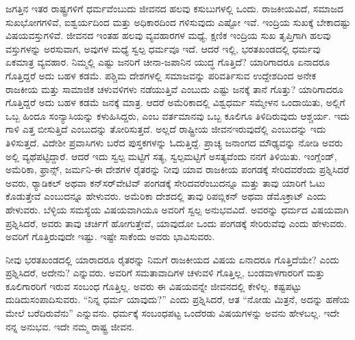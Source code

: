 ಜಗತ್ತಿನ ಇತರ ರಾಷ್ಟ್ರಗಳಿಗೆ ಧರ್ಮವೆಂಬುದು ಜೀವನದ ಹಲವು ಕಸುಬುಗಳಲ್ಲಿ ಒಂದು. ರಾಜಕೀಯವಿದೆ, ಸಮಾಜದ ಸುಖಭೋಗಗಳಿವೆ, ಐಶ್ವರ್ಯದಿಂದ ಮತ್ತು ಅಧಿಕಾರದಿಂದ ಗಳಿಸುವುದು ಎಷ್ಟೋ ಇವೆ. ಇಂದ್ರಿಯ ಸುಖಕ್ಕೆ ಬೇಕಾದಷ್ಟು ವಿಷಯವಸ್ತುಗಳಿವೆ. ಜೀವನದ ಇಂತಹ ಹಲವು ವ್ಯವಹಾರಗಳ ಮಧ್ಯೆ, ಕ್ಷಣಿಕ ಇಂದ್ರಿಯ ಸುಖ ತೃಪ್ತಿಗಾಗಿ ಹಲವು ವಸ್ತುಗಳನ್ನು ಅರಸುವಾಗ, ಅವುಗಳ ಮಧ್ಯೆ ಸ್ವಲ್ಪ ಧರ್ಮವೂ ಇದೆ. ಆದರೆ ಇಲ್ಲಿ, ಭರತಖಂಡದಲ್ಲಿ ಧರ್ಮವು ಏಕಮಾತ್ರ ವ್ಯವಹಾರ. ನಿಮ್ಮಲ್ಲಿ ಎಷ್ಟು ಜನರಿಗೆ ಚೀನಾ-ಜಪಾನಿನ ಯುದ್ಧ ಗೊತ್ತಿದೆ? ಯಾರಿಗಾದರೂ ಏನಾದರೂ ಗೊತ್ತಿದ್ದರೆ ಅದು ಬಹಳ ಕಡಮೆ. ಪಶ್ಚಿಮ ದೇಶಗಳಲ್ಲಿ ಸಮಾಜವನ್ನು ಪರಿವರ್ತಿಸುವ ಉದ್ದೇಶದಿಂದ ಅನೇಕ ರಾಜಕೀಯ ಮತ್ತು ಸಾಮಾಜಿಕ ಚಳುವಳಿಗಳು ನಡೆಯುತ್ತಿವೆ ಎಂಬುದು ಎಷ್ಟು ಜನಕ್ಕೆ ತಾನೆ ಗೊತ್ತು? ಯಾರಿಗಾದರೂ ಗೊತ್ತಿದ್ದರೆ ಅದು ಬಹಳ ಕಡಮೆ ಜನಕ್ಕೆ ಮಾತ್ರ. ಆದರೆ ಅಮೆರಿಕಾದಲ್ಲಿ ವಿಶ್ವಧರ್ಮ ಸಮ್ಮೇಳನ ಒಂದಾಯಿತು, ಅಲ್ಲಿಗೆ ಒಬ್ಬ ಹಿಂದೂ ಸಂನ್ಯಾಸಿಯನ್ನು ಕಳುಹಿಸಿದ್ದರು, ಎಂಬ ವರ್ತಮಾನವು ಒಬ್ಬ ಕೂಲಿಗೂ ತಿಳಿದಿರುವುದು ಆಶ್ಚರ್ಯ. ಇದು ಗಾಳಿ ಎತ್ತ ಬೀಸುತ್ತಿದೆ ಎಂಬುದನ್ನು ತೋರಿಸುತ್ತದೆ. ಅಲ್ಲದೆ ರಾಷ್ಟ್ರೀಯ ಜೀವನ\break ಇರುವುದೆಲ್ಲಿ ಎಂಬುದನ್ನು ಇದು ತಿಳಿಸುತ್ತದೆ. ವಿದೇಶೀ ಪ್ರವಾಸಿಗಳು ಬರೆದ ಪುಸ್ತಕಗಳನ್ನು ಓದುತ್ತಿದ್ದೆ. ಪ್ರಾಚ್ಯ ಜನಾಂಗದ ಮೌಢ್ಯವನ್ನು ನೋಡಿ ಅವರು ಅಲ್ಲಿ ವ್ಯಥೆಪಟ್ಟಿದ್ದಾರೆ. ಆದರೆ ಇದು ಸ್ವಲ್ಪ ಮಟ್ಟಿಗೆ ಸತ್ಯ, ಸ್ವಲ್ಪಮಟ್ಟಿಗೆ ಅಸತ್ಯವೆಂದು ನನಗೆ ತಿಳಿಯಿತು. ಇಂಗ್ಲೆಂಡ್​, ಅಮೆರಿಕಾ, ಫ್ರಾನ್ಸ್, ಜರ್ಮನಿ-ಈ ದೇಶಗಳ ರೈತರನ್ನು ನೀವು ಯಾವ ರಾಜಕೀಯ ಪಂಗಡಕ್ಕೆ ಸೇರಿದವರೆಂದು ಪ್ರಶ್ನಿಸಿದರೆ ಅವರು, ರ‌್ಯಾಡಿಕಲ್​ ಅಥವಾ ಕನ್​ಸರ್​ವೇಟಿವ್​ ಪಂಗಡಕ್ಕೆ ಸೇರಿದವರೆಂಬುದನ್ನೂ ಮತ್ತು ತಾವು ಯಾರಿಗೆ ಓಟು ಕೊಡುತ್ತೇವೆ ಎಂಬುದನ್ನೂ ಹೇಳುವರು. ಅಮೆರಿಕಾ ದೇಶದಲ್ಲಿ ತಾವು ರಿಪಬ್ಲಿಕನ್​ ಅಥವಾ ಡೆಮೊಕ್ರಾಟ್​ ಎಂದು ಹೇಳುವರು. ಬೆಳ್ಳಿಯ ಸಮಸ್ಯೆಯ ವಿಷಯವಾಗಿಯೂ ಅವರಿಗೆ ಸ್ವಲ್ಪ ಅನುಭವವಿದೆ. ಅವರನ್ನು ಧರ್ಮದ ವಿಷಯವಾಗಿ ಪ್ರಶ್ನಿಸಿದರೆ, ಅವರು ತಾವು ಚರ್ಚಿಗೆ ಹೋಗುತ್ತೇವೆ, ಯಾವುದೋ ಒಂದು ಪಂಗಡಕ್ಕೆ ಸೇರಿರುವೆವು ಎಂದು ಹೇಳುವರು. ಅವರಿಗೆ ಗೊತ್ತಿರುವುದೇ ಇಷ್ಟು. ಇಷ್ಟೇ ಸಾಕೆಂದು ಅವರು ಭಾವಿಸುವರು.

ನೀವು ಭರತಖಂಡದಲ್ಲಿ ಯಾರಾದರೂ ರೈತರನ್ನು ನಿಮಗೆ ರಾಜಕೀಯದ ವಿಷಯ ಏನಾದರೂ ಗೊತ್ತಿದೆಯೇ? ಎಂದು ಪ್ರಶ್ನಿಸಿದರೆ, ಅದೇನು? ಎನ್ನುವರು. ಅವರಿಗೆ ಸಮತಾವಾದಿಗಳ ಚಳುವಳಿ ಗೊತ್ತಿಲ್ಲ, ಬಂಡವಾಳಗಾರರಿಗೆ ಮತ್ತು ಕೂಲಿಗಾರರಿಗೆ ಇರುವ ಸಂಬಂಧ ಗೊತ್ತಿಲ್ಲ. ಅವರು ಈ ವಿಷಯವನ್ನೇ ಜೀವನದಲ್ಲಿ ಕೇಳಿಲ್ಲ. ಕಷ್ಟಪಟ್ಟು ದುಡಿದು\break ಸಂಪಾದಿಸುವರು. “ನಿನ್ನ ಧರ್ಮ ಯಾವುದು?” ಎಂದು ಪ್ರಶ್ನಿಸಿದರೆ, ಆತ “ನೋಡು ಮಿತ್ರನೆ, ಅದನ್ನು ಹಣೆಯ ಮೇಲೆ ಬರೆದಿರುವೆನು” ಎನ್ನುವನು. ಧರ್ಮಕ್ಕೆ ಸಂಬಂಧಪಟ್ಟ ಒಂದೆರಡು ವಿಷಯಗಳನ್ನು ಅವನು ಹೇಳಬಲ್ಲ. ಇದೇ ನನ್ನ ಅನುಭವ. ಇದೇ ನಮ್ಮ ರಾಷ್ಟ್ರ ಜೀವನ.

